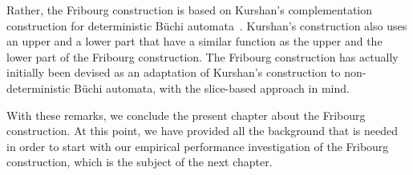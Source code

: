 Rather, the Fribourg construction is based on Kurshan's complementation construction for deterministic Büchi automata~\cite{Kurshan198759}. Kurshan's construction also uses an upper and a lower part that have a similar function as the upper and the lower part of the Fribourg construction. The Fribourg construction has actually initially been devised as an adaptation of Kurshan's construction to non-deterministic Büchi automata, with the slice-based approach in mind.

With these remarks, we conclude the present chapter about the Fribourg construction. At this point, we have provided all the background that is needed in order to start with our empirical performance investigation of the Fribourg construction, which is the subject of the next chapter.




